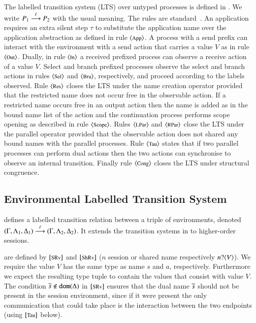 The labelled transition system (LTS) over untyped processes
is defined in .
We write $P_1 \stackrel{\ell}{\longrightarrow} P_2$ with the usual meaning.
The rules are standard~\cite{KYHH2015,KY2015}.
An application requires an extra silent step $\tau$ to substitute
the application name over the application abstraction as defined
in rule ${\footnotesize \langle \textrm{App} \rangle}$.
A process with a send prefix can interact with the environment with a send
action that carries a value $V$ as in rule ${\footnotesize \langle \textrm{Out} \rangle}$.
Dually, in rule ${\footnotesize \langle \textrm{In} \rangle}$
a received prefixed process can observe a receive action of a value $V$.
Select and branch prefixed processes observe the select
and branch actions in rules ${\footnotesize \langle \textrm{Sel} \rangle}$ and ${\footnotesize \langle \textrm{Bra} \rangle}$, respectively,
and proceed according to the labels observed.
Rule ${\footnotesize \langle \textrm{Res} \rangle}$ closes the LTS under the name creation
operator provided that the restricted name does not occur free in the observable action.
If a restricted name occurs free in an output action 
then the name is added as in the bound name list of the action
and the continuation process performs scope opening as described in rule ${\footnotesize \langle \textrm{Scope} \rangle}$.
Rules ${\footnotesize \langle \textrm{LPar} \rangle}$ and ${\footnotesize \langle \textrm{RPar} \rangle}$ close the LTS under the parallel operator 
provided that the observable action does not shared any bound names with the 
parallel processes.
Rule ${\footnotesize \langle \textrm{Tau} \rangle}$ states that if two parallel processes can perform dual actions
then the two actions  can synchronise to observe an internal transition. 
Finally rule ${\footnotesize \langle \textrm{Cong} \rangle}$ closes  the LTS under structural congruence.

\subsection{Environmental Labelled Transition System}



\label{ss:elts}
\noi 
{}
defines a labelled transition relation between 
a triple of environments, 
denoted
$(\Gamma, \Lambda_1, \Delta_1) \stackrel{\ell}{\longrightarrow} (\Gamma, \Lambda_2, \Delta_2)$.
It extends the transition systems
in \cite{KYHH2015,KY2015} 
to higher-order sessions. 

are defined by 
${\footnotesize [\textrm{SRv}]}$ and ${\footnotesize [\textrm{ShRv}]}$
($n$ session or shared name respectively $n ? \langle V \rangle$). 
We require the value $V$ has
the same type as name $s$ and $a$, respectively.  Furthermore we
expect the resulting type tuple to contain the values that consist
with value $V$. The condition $\overline{s} \notin \mathtt{dom}(\Delta)$
in ${\footnotesize [\textrm{SRv}]}$ ensures that 
the dual name $\overline{s}$ should not be
present in the session environment, since if it were present
the only communication that could take place is the interaction
between the two endpoints (using ${\footnotesize [\textrm{Tau}]}$ below).

